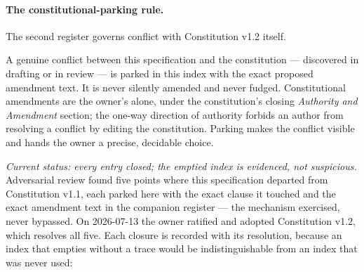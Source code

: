 \paragraph{The constitutional-parking rule.} The second register governs conflict with
Constitution v1.2 itself.

\begin{principle}
A genuine conflict between this specification and the constitution --- discovered in
drafting or in review --- is parked in this index with the exact proposed amendment text.
It is never silently amended and never fudged. Constitutional amendments are the owner's
alone, under the constitution's closing \emph{Authority and Amendment} section; the
one-way direction of authority forbids an author from resolving a conflict by editing the
constitution. Parking makes the conflict visible and hands the owner a precise, decidable
choice.
\end{principle}

\emph{Current status: every entry closed; the emptied index is evidenced, not suspicious.}
Adversarial review found five points where this specification departed from Constitution
v1.1, each parked here with the exact clause it touched and the exact amendment text in the
companion register --- the mechanism exercised, never bypassed. On 2026-07-13 the owner
ratified and adopted Constitution v1.2, which resolves all five. Each closure is recorded
with its resolution, because an index that empties without a trace would be
indistinguishable from an index that was never used:

